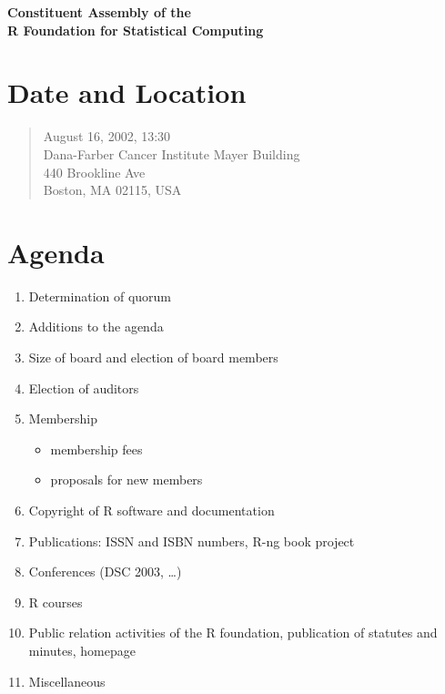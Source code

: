 \documentclass[a4paper]{article}
\begin{document}
\begin{center}
  \LARGE\bf
  Constituent Assembly of the\\ R Foundation for Statistical
  Computing
\end{center}

\medskip

\section*{Date and Location}
\label{sec:date-location}

\begin{quote}
  August 16, 2002, 13:30\\
  Dana-Farber Cancer Institute Mayer Building\\
  440 Brookline Ave\\
  Boston, MA 02115, USA
\end{quote}


\section*{Agenda}
\label{sec:agenda}

\begin{enumerate}
 \item Determination of quorum
 \item Additions to the agenda
 \item Size of board and election of board members
 \item Election of auditors
 \item Membership
  \begin{itemize}
   \item membership fees
   \item proposals for new members
  \end{itemize}
 \item Copyright of R software and documentation
 \item Publications: ISSN and ISBN numbers, R-ng book project
 \item Conferences (DSC 2003, \ldots)
 \item R courses
 \item Public relation activities of the R foundation, publication of
  statutes and minutes, homepage
 \item Miscellaneous
\end{enumerate}
\end{document}
